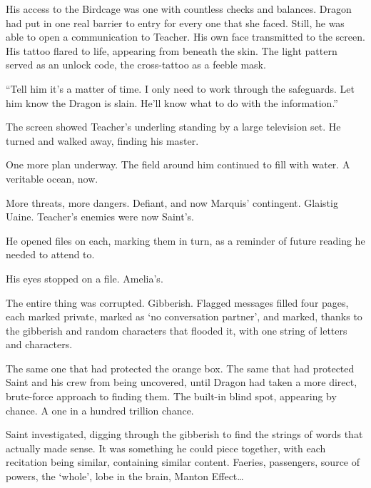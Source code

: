 His access to the Birdcage was one with countless checks and balances.  Dragon had put in one real barrier to entry for every one that she faced.  Still, he was able to open a communication to Teacher.  His own face transmitted to the screen.  His tattoo flared to life, appearing from beneath the skin.  The light pattern served as an unlock code, the cross-tattoo as a feeble mask.



``Tell him it's a matter of time.  I only need to work through the safeguards.  Let him know the Dragon is slain.  He'll know what to do with the information.''



The screen showed Teacher's underling standing by a large television set.  He turned and walked away, finding his master.



One more plan underway.  The field around him continued to fill with water.  A veritable ocean, now.



More threats, more dangers.  Defiant, and now Marquis' contingent.  Glaistig Uaine.  Teacher's enemies were now Saint's.



He opened files on each, marking them in turn, as a reminder of future reading he needed to attend to.



His eyes stopped on a file.  Amelia's.



The entire thing was corrupted.  Gibberish.  Flagged messages filled four pages, each marked private, marked as `no conversation partner', and marked, thanks to the gibberish and random characters that flooded it, with one string of letters and characters.



The same one that had protected the orange box.  The same that had protected Saint and his crew from being uncovered, until Dragon had taken a more direct, brute-force approach to finding them.  The built-in blind spot, appearing by chance.  A one in a hundred trillion chance.



Saint investigated, digging through the gibberish to find the strings of words that actually made sense.  It was something he could piece together, with each recitation being similar, containing similar content.  Faeries, passengers, source of powers, the `whole', lobe in the brain, Manton Effect\ldots



